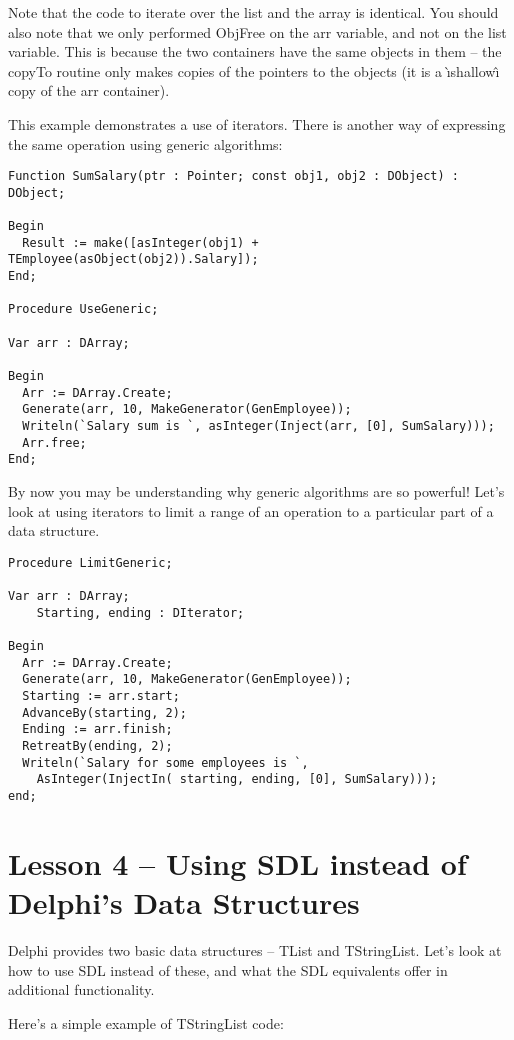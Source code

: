 \documentclass{report}
\begin{document}
Note that the code to iterate over the list and the array is identical. You
should also note that we only performed ObjFree on the arr variable, and not
on the list variable. This is because the two containers have the same
objects in them -- the copyTo routine only makes copies of the pointers to
the objects (it is a \`{\i}shallow\^{\i} copy of the arr container).

This example demonstrates a use of iterators. There is another 
way of expressing the same operation using generic algorithms:

\begin{lstlisting}
Function SumSalary(ptr : Pointer; const obj1, obj2 : DObject) : DObject;

Begin
  Result := make([asInteger(obj1) + TEmployee(asObject(obj2)).Salary]);
End;

Procedure UseGeneric;

Var arr : DArray;

Begin
  Arr := DArray.Create;
  Generate(arr, 10, MakeGenerator(GenEmployee));
  Writeln(`Salary sum is `, asInteger(Inject(arr, [0], SumSalary)));
  Arr.free;
End;
\end{lstlisting}

By now you may be understanding why generic algorithms 
are so powerful! Let's look at
using iterators to limit a range of an operation to a 
particular part of a data structure.

\begin{lstlisting}
Procedure LimitGeneric;

Var arr : DArray;
    Starting, ending : DIterator;

Begin
  Arr := DArray.Create;
  Generate(arr, 10, MakeGenerator(GenEmployee));
  Starting := arr.start;
  AdvanceBy(starting, 2);
  Ending := arr.finish;
  RetreatBy(ending, 2);
  Writeln(`Salary for some employees is `,
    AsInteger(InjectIn( starting, ending, [0], SumSalary)));
end;
\end{lstlisting}

\section{Lesson 4 -- Using SDL instead of Delphi's Data Structures}

Delphi provides two basic data structures -- TList and TStringList. Let's
look at how to use SDL instead of these, and what the SDL equivalents offer
in additional functionality.

Here's a simple example of TStringList code:
\end{document}
